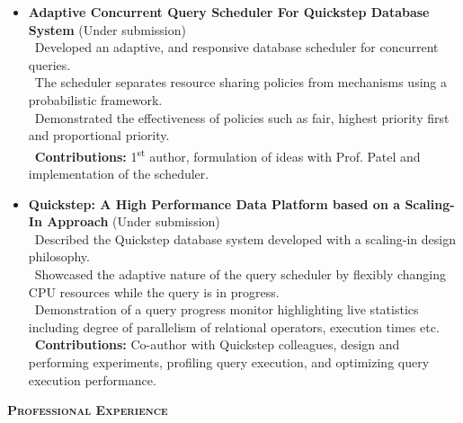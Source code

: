 \documentclass[11pt]{article}
\newcommand{\graybox}[1]{\begin{mdframed}[backgroundcolor=light-gray, linecolor=light-gray, roundcorner=10pt, shadow=false, shadowsize=1pt]
\Large{\textbf{\textsc{#1}}}
\end{mdframed}}
\begin{document}
\begin{itemize}\addtolength{\itemsep}{-0.5\baselineskip}
\item{\textbf{Adaptive Concurrent Query Scheduler For Quickstep Database System} (Under submission)}\\
		\textendash\ Developed an adaptive, and responsive database scheduler for concurrent queries.\\
		\textendash\ The scheduler separates resource sharing policies from mechanisms using a probabilistic framework. \\
		\textendash\ Demonstrated the effectiveness of policies such as fair, highest priority first and proportional priority.\\
		\textendash\ \textbf{Contributions:} 1\textsuperscript{st} author, formulation of ideas with Prof. Patel and implementation of the scheduler.\\
\item{\textbf{Quickstep: A High Performance Data Platform based
on a Scaling-In Approach} (Under submission)}	\\
		\textendash\ Described the Quickstep database system developed with a scaling-in design philosophy.\\
		\textendash\ Showcased the adaptive nature of the query scheduler by flexibly changing CPU resources while the query is in progress. \\
		\textendash\ Demonstration of a query progress monitor highlighting live statistics including degree of parallelism of relational operators, execution times etc.\\
		\textendash\ \textbf{Contributions:} Co-author with Quickstep colleagues, design and performing experiments, profiling query execution, and optimizing query execution performance.
\end{itemize}
\graybox{Professional Experience}
\end{document}
